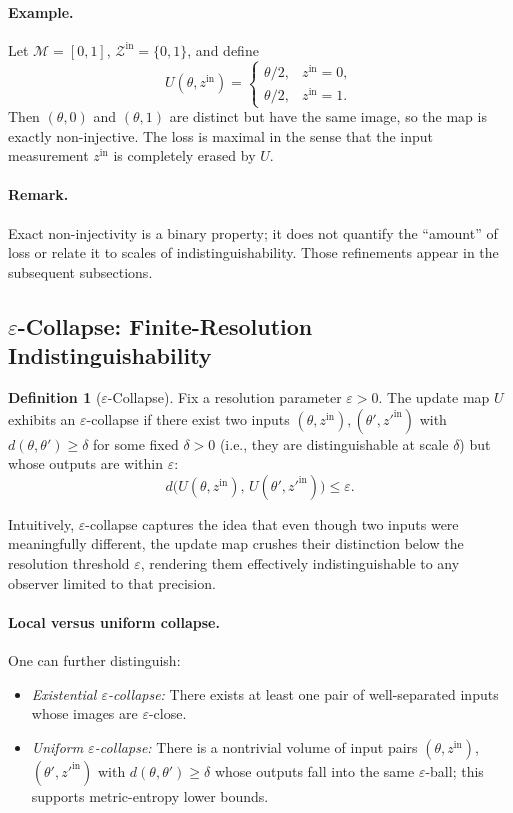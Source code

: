 \documentclass[12pt]{article}
\theoremstyle{definition}
\newtheorem{definition}{Definition}[section]
\theoremstyle{plain}
\begin{document}
\paragraph{Example.} Let \(\mathcal{M} = [0,1]\), \(\mathcal{Z}^{\mathrm{in}}=\{0,1\}\), and define
\[
U(\theta, z^{\mathrm{in}}) = 
\begin{cases}
\theta/2, & z^{\mathrm{in}}=0,\\
\theta/2, & z^{\mathrm{in}}=1.
\end{cases}
\]
Then \((\theta,0)\) and \((\theta,1)\) are distinct but have the same image, so the map is exactly non-injective.  The loss is maximal in the sense that the input measurement \(z^{\mathrm{in}}\) is completely erased by \(U\).

\paragraph{Remark.} Exact non-injectivity is a binary property; it does not quantify the ``amount'' of loss or relate it to scales of indistinguishability.  Those refinements appear in the subsequent subsections.  

\subsection{\(\varepsilon\)-Collapse: Finite-Resolution Indistinguishability}

\begin{definition}[\(\varepsilon\)-Collapse]
Fix a resolution parameter \(\varepsilon>0\).  The update map \(U\) exhibits an \(\varepsilon\)-collapse if there exist two inputs \((\theta,z^{\mathrm{in}}), (\theta',z'^{\mathrm{in}})\) with \(d(\theta,\theta') \ge \delta\) for some fixed \(\delta>0\) (i.e., they are distinguishable at scale \(\delta\)) but whose outputs are within \(\varepsilon\):
\[
d\bigl(U(\theta,z^{\mathrm{in}}),\,U(\theta',z'^{\mathrm{in}})\bigr) \le \varepsilon.
\]
\end{definition}

Intuitively, \(\varepsilon\)-collapse captures the idea that even though two inputs were meaningfully different, the update map crushes their distinction below the resolution threshold \(\varepsilon\), rendering them effectively indistinguishable to any observer limited to that precision.

\paragraph{Local versus uniform collapse.} One can further distinguish:
\begin{itemize}
    \item \emph{Existential \(\varepsilon\)-collapse:} There exists at least one pair of well-separated inputs whose images are \(\varepsilon\)-close.
    \item \emph{Uniform \(\varepsilon\)-collapse:} There is a nontrivial volume of input pairs \((\theta,z^{\mathrm{in}})\), \((\theta',z'^{\mathrm{in}})\) with \(d(\theta,\theta')\ge \delta\) whose outputs fall into the same \(\varepsilon\)-ball; this supports metric-entropy lower bounds.
\end{itemize}
\end{document}
